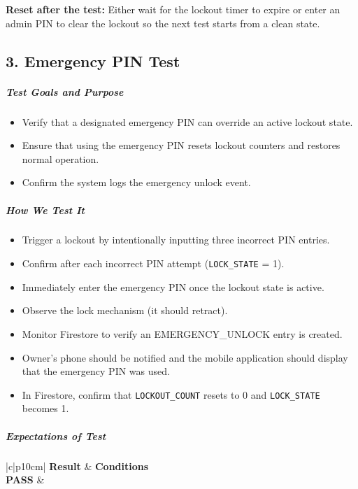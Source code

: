 \noindent\textbf{Reset after the test:}  
Either wait for the lockout timer to expire or enter an admin PIN to clear the lockout so the next test starts from a clean state.\\


\newpage
\begin{samepage}
    \subsection*{3. Emergency PIN Test}
    \subparagraph{Test Goals and Purpose}
    \begin{itemize}
        \item Verify that a designated emergency PIN can override an active lockout state.
        \item Ensure that using the emergency PIN resets lockout counters and restores normal operation.
        \item Confirm the system logs the emergency unlock event.
    \end{itemize}
    \subparagraph{How We Test It}
    \begin{itemize}
        \item Trigger a lockout by intentionally inputting three incorrect PIN entries.
        \item Confirm after each incorrect PIN attempt (\texttt{LOCK\_STATE} = 1).
        \item Immediately enter the emergency PIN once the lockout state is active.
        \item Observe the lock mechanism (it should retract).
        \item Monitor Firestore to verify an EMERGENCY\_UNLOCK entry is created.
        \item Owner's phone should be notified and the mobile application should display that the emergency PIN was used.
        \item In Firestore, confirm that \texttt{LOCKOUT\_COUNT} resets to 0 and \texttt{LOCK\_STATE} becomes 1.
    \end{itemize}
    \subparagraph{Expectations of Test}
    \begin{center}
    \begin{tabular}{|c|p{10cm}|}
      \hline
      \textbf{Result} & \textbf{Conditions} \\
      \hline
      \textbf{PASS} &
        \begin{minipage}[t]{\linewidth}
        \begin{itemize}

\end{itemize}
\end{minipage}
\end{tabular}
\end{center}
\end{samepage}
